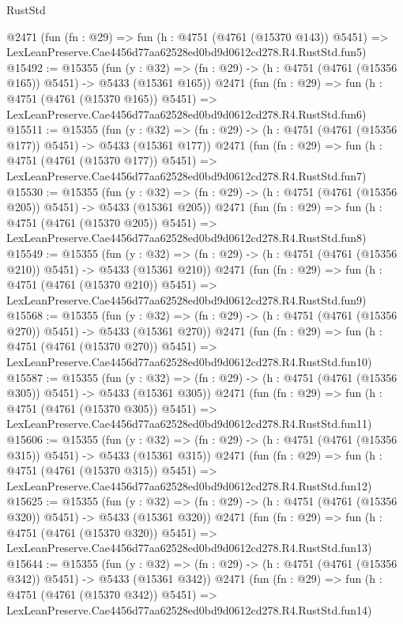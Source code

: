 \begin{lexlean}{RustStd}
\begin{coremodule}
    @2471
    (fun (fn : @29) =>
    fun (h : @4751 (@4761 (@15370 @143)) @5451) =>
    LexLeanPreserve.Cae4456d77aa62528ed0bd9d0612cd278.R4.RustStd.fun5)
@15492 := @15355
    (fun (y : @32) => (fn : @29) -> (h : @4751 (@4761 (@15356 @165)) @5451) -> @5433 (@15361 @165))
    @2471
    (fun (fn : @29) =>
    fun (h : @4751 (@4761 (@15370 @165)) @5451) =>
    LexLeanPreserve.Cae4456d77aa62528ed0bd9d0612cd278.R4.RustStd.fun6)
@15511 := @15355
    (fun (y : @32) => (fn : @29) -> (h : @4751 (@4761 (@15356 @177)) @5451) -> @5433 (@15361 @177))
    @2471
    (fun (fn : @29) =>
    fun (h : @4751 (@4761 (@15370 @177)) @5451) =>
    LexLeanPreserve.Cae4456d77aa62528ed0bd9d0612cd278.R4.RustStd.fun7)
@15530 := @15355
    (fun (y : @32) => (fn : @29) -> (h : @4751 (@4761 (@15356 @205)) @5451) -> @5433 (@15361 @205))
    @2471
    (fun (fn : @29) =>
    fun (h : @4751 (@4761 (@15370 @205)) @5451) =>
    LexLeanPreserve.Cae4456d77aa62528ed0bd9d0612cd278.R4.RustStd.fun8)
@15549 := @15355
    (fun (y : @32) => (fn : @29) -> (h : @4751 (@4761 (@15356 @210)) @5451) -> @5433 (@15361 @210))
    @2471
    (fun (fn : @29) =>
    fun (h : @4751 (@4761 (@15370 @210)) @5451) =>
    LexLeanPreserve.Cae4456d77aa62528ed0bd9d0612cd278.R4.RustStd.fun9)
@15568 := @15355
    (fun (y : @32) => (fn : @29) -> (h : @4751 (@4761 (@15356 @270)) @5451) -> @5433 (@15361 @270))
    @2471
    (fun (fn : @29) =>
    fun (h : @4751 (@4761 (@15370 @270)) @5451) =>
    LexLeanPreserve.Cae4456d77aa62528ed0bd9d0612cd278.R4.RustStd.fun10)
@15587 := @15355
    (fun (y : @32) => (fn : @29) -> (h : @4751 (@4761 (@15356 @305)) @5451) -> @5433 (@15361 @305))
    @2471
    (fun (fn : @29) =>
    fun (h : @4751 (@4761 (@15370 @305)) @5451) =>
    LexLeanPreserve.Cae4456d77aa62528ed0bd9d0612cd278.R4.RustStd.fun11)
@15606 := @15355
    (fun (y : @32) => (fn : @29) -> (h : @4751 (@4761 (@15356 @315)) @5451) -> @5433 (@15361 @315))
    @2471
    (fun (fn : @29) =>
    fun (h : @4751 (@4761 (@15370 @315)) @5451) =>
    LexLeanPreserve.Cae4456d77aa62528ed0bd9d0612cd278.R4.RustStd.fun12)
@15625 := @15355
    (fun (y : @32) => (fn : @29) -> (h : @4751 (@4761 (@15356 @320)) @5451) -> @5433 (@15361 @320))
    @2471
    (fun (fn : @29) =>
    fun (h : @4751 (@4761 (@15370 @320)) @5451) =>
    LexLeanPreserve.Cae4456d77aa62528ed0bd9d0612cd278.R4.RustStd.fun13)
@15644 := @15355
    (fun (y : @32) => (fn : @29) -> (h : @4751 (@4761 (@15356 @342)) @5451) -> @5433 (@15361 @342))
    @2471
    (fun (fn : @29) =>
    fun (h : @4751 (@4761 (@15370 @342)) @5451) =>
    LexLeanPreserve.Cae4456d77aa62528ed0bd9d0612cd278.R4.RustStd.fun14)

\end{coremodule}
\end{lexlean}
